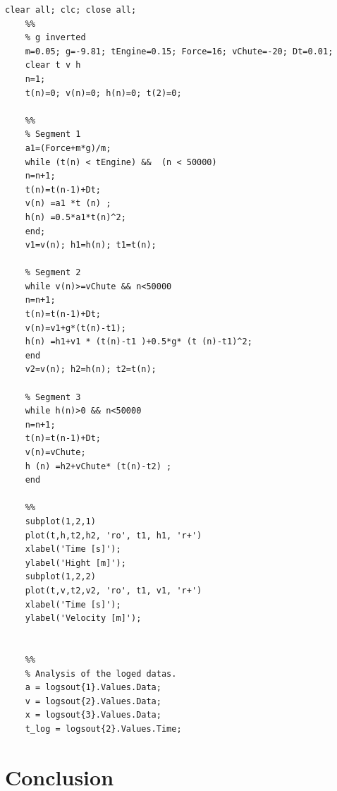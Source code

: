 \newpage
\begin{lstlisting}[caption={Matlabcode from the handout},label=lst:code1]
	clear all; clc; close all;	
	%%
	% g inverted
	m=0.05; g=-9.81; tEngine=0.15; Force=16; vChute=-20; Dt=0.01; 
	clear t v h 
	n=1; 
	t(n)=0; v(n)=0; h(n)=0; t(2)=0;
	
	%%
	% Segment 1 
	a1=(Force+m*g)/m; 
	while (t(n) < tEngine) &&  (n < 50000) 
	n=n+1; 
	t(n)=t(n-1)+Dt; 
	v(n) =a1 *t (n) ; 
	h(n) =0.5*a1*t(n)^2;
	end;
	v1=v(n); h1=h(n); t1=t(n);
	
	% Segment 2
	while v(n)>=vChute && n<50000
	n=n+1;
	t(n)=t(n-1)+Dt;
	v(n)=v1+g*(t(n)-t1);
	h(n) =h1+v1 * (t(n)-t1 )+0.5*g* (t (n)-t1)^2;
	end
	v2=v(n); h2=h(n); t2=t(n);
	
	% Segment 3
	while h(n)>0 && n<50000
	n=n+1;
	t(n)=t(n-1)+Dt;
	v(n)=vChute;
	h (n) =h2+vChute* (t(n)-t2) ;
	end
	
	%%
	subplot(1,2,1)
	plot(t,h,t2,h2, 'ro', t1, h1, 'r+')
	xlabel('Time [s]');
	ylabel('Hight [m]');
	subplot(1,2,2)
	plot(t,v,t2,v2, 'ro', t1, v1, 'r+')
	xlabel('Time [s]');
	ylabel('Velocity [m]');
	
	
	%%
	% Analysis of the loged datas. 
	a = logsout{1}.Values.Data;
	v = logsout{2}.Values.Data;
	x = logsout{3}.Values.Data;
	t_log = logsout{2}.Values.Time;
\end{lstlisting}
	
	
\section{Conclusion}
